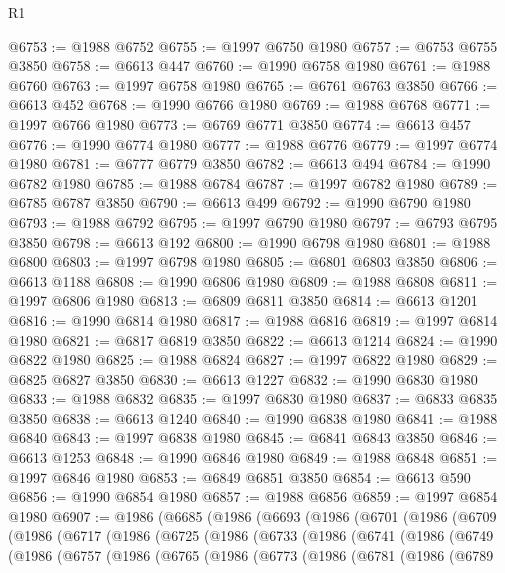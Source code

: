 \begin{lexlean}{R1}
\begin{coremodule}
@6753 := @1988 @6752
@6755 := @1997 @6750 @1980
@6757 := @6753 @6755 @3850
@6758 := @6613 @447
@6760 := @1990 @6758 @1980
@6761 := @1988 @6760
@6763 := @1997 @6758 @1980
@6765 := @6761 @6763 @3850
@6766 := @6613 @452
@6768 := @1990 @6766 @1980
@6769 := @1988 @6768
@6771 := @1997 @6766 @1980
@6773 := @6769 @6771 @3850
@6774 := @6613 @457
@6776 := @1990 @6774 @1980
@6777 := @1988 @6776
@6779 := @1997 @6774 @1980
@6781 := @6777 @6779 @3850
@6782 := @6613 @494
@6784 := @1990 @6782 @1980
@6785 := @1988 @6784
@6787 := @1997 @6782 @1980
@6789 := @6785 @6787 @3850
@6790 := @6613 @499
@6792 := @1990 @6790 @1980
@6793 := @1988 @6792
@6795 := @1997 @6790 @1980
@6797 := @6793 @6795 @3850
@6798 := @6613 @192
@6800 := @1990 @6798 @1980
@6801 := @1988 @6800
@6803 := @1997 @6798 @1980
@6805 := @6801 @6803 @3850
@6806 := @6613 @1188
@6808 := @1990 @6806 @1980
@6809 := @1988 @6808
@6811 := @1997 @6806 @1980
@6813 := @6809 @6811 @3850
@6814 := @6613 @1201
@6816 := @1990 @6814 @1980
@6817 := @1988 @6816
@6819 := @1997 @6814 @1980
@6821 := @6817 @6819 @3850
@6822 := @6613 @1214
@6824 := @1990 @6822 @1980
@6825 := @1988 @6824
@6827 := @1997 @6822 @1980
@6829 := @6825 @6827 @3850
@6830 := @6613 @1227
@6832 := @1990 @6830 @1980
@6833 := @1988 @6832
@6835 := @1997 @6830 @1980
@6837 := @6833 @6835 @3850
@6838 := @6613 @1240
@6840 := @1990 @6838 @1980
@6841 := @1988 @6840
@6843 := @1997 @6838 @1980
@6845 := @6841 @6843 @3850
@6846 := @6613 @1253
@6848 := @1990 @6846 @1980
@6849 := @1988 @6848
@6851 := @1997 @6846 @1980
@6853 := @6849 @6851 @3850
@6854 := @6613 @590
@6856 := @1990 @6854 @1980
@6857 := @1988 @6856
@6859 := @1997 @6854 @1980
@6907 := @1986
    (@6685
      (@1986
        (@6693
          (@1986
            (@6701
              (@1986
                (@6709
                  (@1986
                    (@6717
                      (@1986
                        (@6725
                          (@1986
                            (@6733
                              (@1986
                                (@6741
                                  (@1986
                                    (@6749
                                      (@1986
                                        (@6757
                                          (@1986
                                            (@6765
                                              (@1986
                                                (@6773
                                                  (@1986
                                                    (@6781
                                                      (@1986
                                                        (@6789

\end{coremodule}
\end{lexlean}
